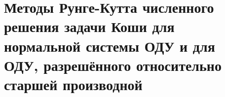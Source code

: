 \documentclass[__main__.tex]{subfiles}
\begin{document}
\section{Методы Рунге-Кутта численного решения задачи Коши для нормальной системы ОДУ и для ОДУ, разрешённого относительно старшей производной}
\end{document}
